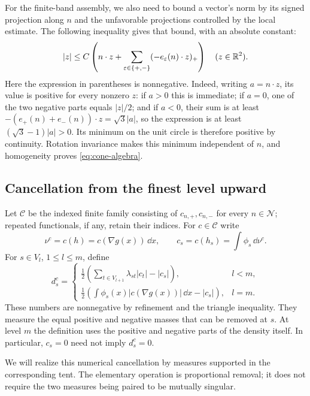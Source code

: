 For the finite-band assembly, we also need to bound a vector's norm
by its signed projection along $n$ and the unfavorable projections
controlled by the local estimate. The following inequality gives
that bound, with an absolute constant:
\begin{equation}
 |z|\le C\left(n\cdot z+
                \sum_{\varepsilon\in\{+,-\}}
                (-e_\varepsilon(n)\cdot z)_+\right)
 \quad(z\in\mathbb R^2).
 \label{eq:cone-algebra}
\end{equation}
Here the expression in parentheses is nonnegative. Indeed, writing
$a=n\cdot z$, its value is positive for every nonzero $z$: if $a>0$
this is immediate; if $a=0$, one of the two negative parts equals
$|z|/2$; and if $a<0$, their sum is at least
$-(e_+(n)+e_-(n))\cdot z=\sqrt3|a|$, so the expression is at least
$(\sqrt3-1)|a|>0$. Its minimum on the unit circle is therefore positive
by continuity. Rotation invariance makes this minimum independent of
$n$, and homogeneity proves \eqref{eq:cone-algebra}.

\subsection{Cancellation from the finest level upward}

Let $\mathcal C$ be the indexed finite family consisting of
$c_{n,+},c_{n,-}$ for every $n\in\mathcal N$; repeated functionals,
if any, retain their indices. For $c\in\mathcal C$ write
\[
 \nu^c=c(h)=c(\nabla g(x))\,\dd x,
 \qquad c_s=c(h_s)=\int\phi_s\,\dd\nu^c.
\]
For $s\in V_l$, $1\le l\le m$, define
\begin{equation}
 d_s^c=
 \begin{cases}
 \displaystyle\frac12\left(
       \sum_{t\in V_{l+1}}\lambda_{st}|c_t|-|c_s|\right),
       & l<m,\\[6pt]
 \displaystyle\frac12\left(
       \int\phi_s(x)|c(\nabla g(x))|\,\dd x-|c_s|\right),
       & l=m.
 \end{cases}
 \label{eq:prices-scalar-defects}
\end{equation}
These numbers are nonnegative by refinement and the triangle
inequality. They measure the equal positive and negative masses
that can be removed at $s$. At level $m$ the definition uses the
positive and negative parts of the density itself. In particular,
$c_s=0$ need not imply $d_s^c=0$.

We will realize this numerical cancellation by measures supported
in the corresponding tent. The elementary operation
is proportional removal; it does not require the two measures
being paired to be mutually singular.

